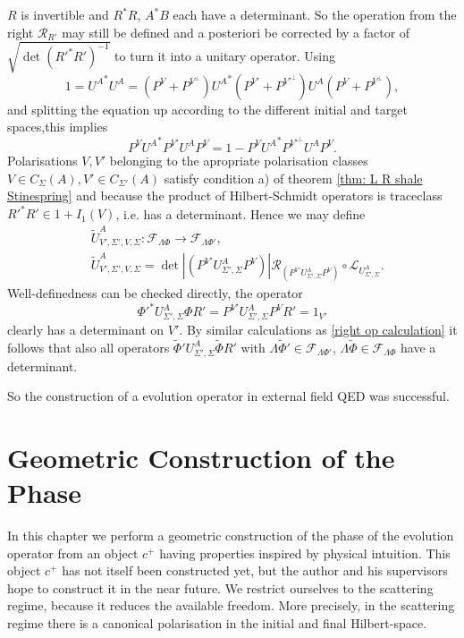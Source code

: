 \documentclass[b5paper,draft,openbib,12pt]{memoir}
\begin{document}
\(R\) is invertible and \(R^* R\), \(A^*B\) each have 
a determinant. So the operation from the 
right \(\mathcal{R}_{R'}\) may still be defined and
a posteriori be corrected by a factor of 
\(\sqrt{\det ( {R'}^* R')^{-1}}\) to turn 
it into a unitary operator.
Using
\begin{equation}
1= {U^A}^* U^A =(P^V+P^{V^\perp}) {U^A}^* (P^{V'}+P^{{V'}^\perp}) U^A (P^V+P^{V^\perp}),
\end{equation}
and splitting 
the equation up according to the different initial and 
target spaces,this implies 
\begin{equation}
  P^V {U^A}^* P^{V'}U^A P^V = 1- P^{V}{U^A}^* P^{{V'}^\perp} U^A P^{V}.
\end{equation}
Polarisations \(V,V'\) belonging to the apropriate polarisation 
classes \(V\in C_\Sigma(A), V'\in C_{\Sigma'}(A)\) satisfy
condition a) of 
theorem \ref{thm: L R shale Stinespring} and because 
the product of Hilbert-Schmidt operators is traceclass
 \({R'}^*R'\in 1 +I_1(V)\), i.e.
has a determinant. Hence we may define 
\begin{align}
  &\tilde{U}^A_{V',\Sigma',V,\Sigma}:\mathcal{F}_{\mathsf{\Lambda}\Phi}\rightarrow \mathcal{F}_{\mathsf{\Lambda}\Phi'},\\
  &\tilde{U}^A_{V',\Sigma',V,\Sigma}=\det|(P^{V'} U^A_{\Sigma',\Sigma} P^V)| \mathcal{R}_{(P^{V'} U^A_{\Sigma',\Sigma} P^V)} \circ \mathcal{L}_{U^A_{\Sigma',\Sigma}}.
\end{align}
Well-definedness can be checked directly, the operator
\begin{equation}
  {\Phi'}^* U^A_{\Sigma',\Sigma} \Phi R' 
  =P^{V'} U_{\Sigma',\Sigma}^A P^{V}R' 
  = 1_{V'}
\end{equation}
clearly has a determinant on \(V'\). By similar 
calculations as \eqref{right op calculation} 
it follows that also all operators 
\(\tilde{\Phi}'U^A_{\Sigma',\Sigma} \tilde{\Phi}R'\)
with \(\mathsf{\Lambda}\tilde{\Phi}'\in \mathcal{F}_{\mathsf{\Lambda}\Phi'}\),
\(\mathsf{\Lambda}\tilde{\Phi}\in \mathcal{F}_{\mathsf{\Lambda}\Phi}\)
have a determinant.

So the construction of a evolution operator in external field 
QED was successful.


\section{Geometric Construction of the Phase}\label{chapter geometery}
In this chapter we perform a geometric construction of the phase 
of the evolution operator from an object \(c^+\) having properties 
inspired by physical intuition. This object \(c^+\) has not 
itself been constructed yet, but the author and his supervisors 
hope to construct it in the near future. 
We restrict ourselves to the scattering regime, because it reduces 
the available freedom. More precisely, in the scattering regime 
there is a canonical polarisation in the initial and final Hilbert-space.
\end{document}
